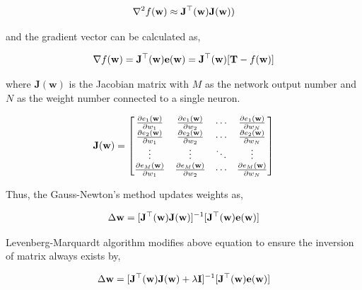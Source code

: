 \documentclass[procedia]{easychair}
\begin{document}
\begin{equation}
    \nabla ^ 2 f( \mathbf{w} ) \approx \mathbf{J} ^ \top ( \mathbf{w} ) \mathbf{J} ( \mathbf{w} ) ) \notag
\end{equation}

and the gradient vector can be calculated as,

\begin{equation}
    \nabla f( \mathbf{w} ) = \mathbf{J} ^ \top ( \mathbf{w} ) \mathbf{e} ( \mathbf{w} ) = \mathbf{J} ^ \top ( \mathbf{w} ) [ \mathbf{T} - f( \mathbf{w} ) ] \notag
\end{equation}

where $\mathbf{J}( \mathbf{w} )$ is the Jacobian matrix with $M$ as the network output number and $N$ as the weight number connected to a single neuron.

\begin{equation}
    \mathbf{J}( \mathbf{w} ) =
    \begin{bmatrix}
        \frac{ \partial e_1( \mathbf{w} ) }{ \partial w_1 } & \frac{ \partial e_1( \mathbf{w} ) }{ \partial w_2 } & \cdots & \frac{ \partial e_1( \mathbf{w} ) }{ \partial w_N } \\
        \frac{ \partial e_2( \mathbf{w} ) }{ \partial w_1 } & \frac{ \partial e_2( \mathbf{w} ) }{ \partial w_2 } & \cdots & \frac{ \partial e_2( \mathbf{w} ) }{ \partial w_N } \\
        \vdots & \vdots & \ddots & \vdots \\
        \frac{ \partial e_M( \mathbf{w} ) }{ \partial w_1 } & \frac{ \partial e_M( \mathbf{w} ) }{ \partial w_2 } & \cdots & \frac{ \partial e_M( \mathbf{w} ) }{ \partial w_N }
    \end{bmatrix} \notag
\end{equation}

Thus, the Gauss-Newton’s method updates weights as,

\begin{equation}
    \Delta \mathbf{w} = [ \mathbf{J} ^ \top ( \mathbf{w} ) \mathbf{J} ( \mathbf{w} ) ] ^ {-1} [ \mathbf{J} ^ \top ( \mathbf{w} ) \mathbf{e} ( \mathbf{w} ) ] \notag
\end{equation}

Levenberg-Marquardt algorithm modifies above equation to ensure the inversion of matrix always exists by,

\begin{equation}
    \Delta \mathbf{w} = [ \mathbf{J} ^ \top ( \mathbf{w} ) \mathbf{J} ( \mathbf{w} ) + \lambda \mathbf{I} ] ^ {-1} [ \mathbf{J} ^ \top ( \mathbf{w} ) \mathbf{e} ( \mathbf{w} ) ] \notag
\end{equation}
\end{document}
